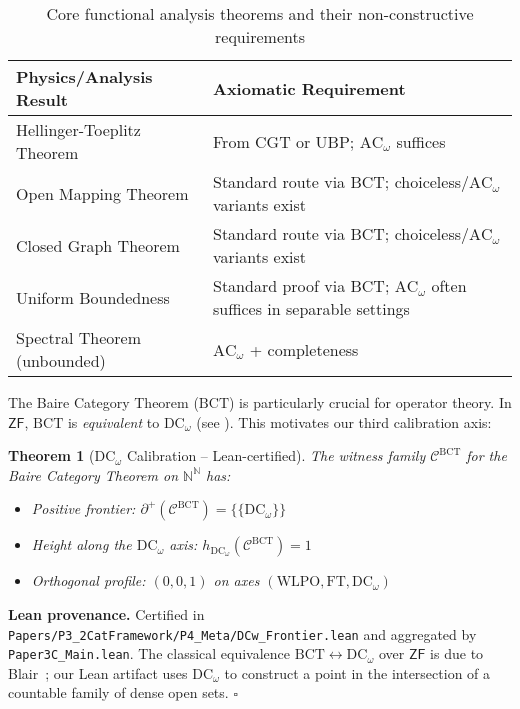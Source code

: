 \documentclass[11pt]{article}
\newtheorem{theorem}{Theorem}[section]
\newenvironment{proof}[1][Proof]{\noindent\textbf{#1.}\hspace{0.5em}}{\hfill$\square$\par}
\newcommand{\N}{\mathbb{N}}
\newcommand{\WLPO}{\mathrm{WLPO}}
\newcommand{\FT}{\mathrm{FT}}
\newcommand{\DCw}{\mathrm{DC}_\omega}
\newcommand{\ACw}{\mathrm{AC}_\omega}
\newcommand{\BCT}{\mathrm{BCT}}
\newcommand{\Frontierpos}{\partial^{+}}
\begin{document}
\begin{table}[h]
\centering
\begin{tabular}{ll}
\hline
\textbf{Physics/Analysis Result} & \textbf{Axiomatic Requirement} \\
\hline
Hellinger-Toeplitz Theorem & From CGT or UBP; $\ACw{}$ suffices \\
Open Mapping Theorem & Standard route via BCT; choiceless/$\ACw{}$ variants exist \\
Closed Graph Theorem & Standard route via BCT; choiceless/$\ACw{}$ variants exist \\
Uniform Boundedness & Standard proof via BCT; $\ACw{}$ often suffices in separable settings \\
Spectral Theorem (unbounded) & $\ACw{}$ + completeness \\
\hline
\end{tabular}
\caption{Core functional analysis theorems and their non-constructive requirements}
\label{tab:physics-analysis}
\end{table}

The Baire Category Theorem ($\BCT{}$) is particularly crucial for operator theory. In $\mathsf{ZF}$, $\BCT{}$ is \emph{equivalent} to $\DCw{}$ (see \cite{Blair77}). This motivates our third calibration axis:

\begin{theorem}[$\DCw{}$ Calibration -- Lean-certified]\label{thm:dcw-calib}
The witness family $\mathcal{C}^{\BCT}$ for the Baire Category Theorem on $\N^\N$ has:
\begin{itemize}
\item Positive frontier: $\Frontierpos(\mathcal{C}^{\BCT}) = \{\{\DCw\}\}$
\item Height along the $\DCw{}$ axis: $h_{\DCw}(\mathcal{C}^{\BCT}) = 1$
\item Orthogonal profile: $(0, 0, 1)$ on axes $(\WLPO, \FT, \DCw)$
\end{itemize}
\end{theorem}

\begin{proof}[Lean provenance]
Certified in \texttt{Papers/P3\_2CatFramework/P4\_Meta/DCw\_Frontier.lean} and aggregated by
\texttt{Paper3C\_Main.lean}. The classical equivalence $\BCT\leftrightarrow\DCw$ over $\mathsf{ZF}$
is due to Blair~\cite{Blair77}; our Lean artifact uses $\DCw$ to construct a point in the
intersection of a countable family of dense open sets.
\end{proof}
\end{document}
